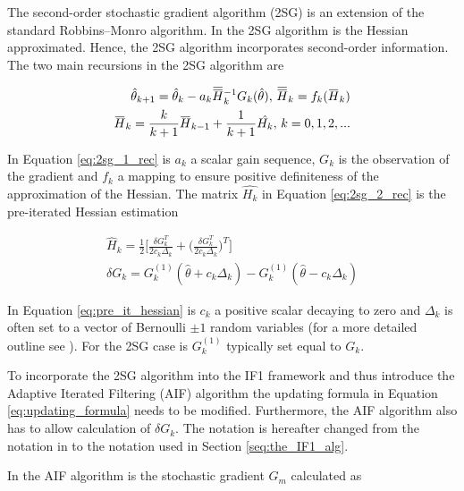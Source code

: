 \documentclass[twoside,openright]{report}
\newcommand{\overbar}[1]{\mkern 1.5mu\overline{\mkern-1.5mu#1\mkern-1.5mu}\mkern 1.5mu}
\begin{document}
The second-order stochastic gradient algorithm (2SG) is an extension of the standard Robbins–Monro algorithm. In the 2SG algorithm is the Hessian approximated. Hence, the 2SG algorithm incorporates second-order information. The two main recursions in the 2SG algorithm are \cite{spall2000adaptive}

\begin{align}
    \hat{\theta}_{k+1} = \hat{\theta}_k - a_k \overbar{\overbar{H}}_{k}^{-1} G_k ( \hat{\theta}) , \, \overbar{\overbar{H}}_{k} = f_k (\overbar{H}_k) \label{eq:2sg_1_rec} \\
    \overbar{H}_k = \frac{k}{k+1} \overbar{H}_{k-1} + \frac{1}{k+1} \hat{H_k}, \,  k = 0,1,2,... \label{eq:2sg_2_rec}
\end{align}

In Equation \ref{eq:2sg_1_rec} is $a_k$ a scalar gain sequence, $G_k$ is the observation of the gradient  and $f_k$ a mapping to ensure positive definiteness of the approximation of the Hessian. The matrix  $\hat{H_k}$ in Equation \ref{eq:2sg_2_rec} is the pre-iterated Hessian estimation 

\begin{align}
    \hat{H}_k = \frac{1}{2} \Big[ \frac{\delta G_{k}^{T}}{2 c_k \Delta_k } + \Big( \frac{\delta G_{k}^{T}}{2 c_k \Delta_k } \Big)^{T} \Big] \label{eq:pre_it_hessian}\\ 
    \delta G_{k} = G^{(1)}_{k}(\hat{\theta} + c_k \Delta_k ) -  G^{(1)}_{k}( \hat{\theta} - c_k \Delta_k ) \label{eq:delta_G}
\end{align}

In Equation \ref{eq:pre_it_hessian} is $c_k$ a positive scalar decaying to zero and $\Delta_k$ is often set to a vector of Bernoulli $\pm 1$ random variables (for a more detailed outline see \cite{spall2000adaptive}). For the 2SG case is  $G^{(1)}_{k}$ typically set equal to $G_{k}$. 


To incorporate the 2SG algorithm into the IF1 framework and thus introduce the Adaptive Iterated Filtering (AIF) algorithm  the updating formula in Equation \ref{eq:updating_formula} needs to be modified. Furthermore, the AIF algorithm also has to allow calculation of $\delta G_{k}$. The notation is hereafter changed from the notation in \cite{spall2000adaptive} to the notation used in Section \ref{seq:the_IF1_alg}. 

In the AIF algorithm is the stochastic gradient $G_m$ calculated as  
\end{document}

